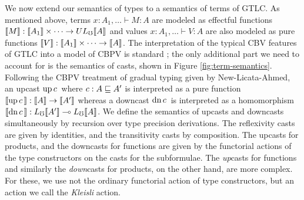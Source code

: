 We now extend our semantics of types to a semantics of terms of
GTLC. As mentioned above, terms $x:A_1,\ldots \vdash M : A$ are
modeled as effectful functions $\llbracket {M} \rrbracket: \llbracket {A_1} \rrbracket\times \cdots \to UL_\mho\llbracket {A} \rrbracket$
and values $x:A_1,\ldots \vdash V : A$ are also modeled as pure
functions $\llbracket {V} \rrbracket : \llbracket {A_1} \rrbracket\times\cdots \to \llbracket {A} \rrbracket$.
%
The interpretation of the typical CBV features of GTLC into a model of CBPV is
standard \cite{levy99}; the only additional part we need to account for
is the semantics of casts, shown in Figure \ref{fig:term-semantics}.
%
%
Following the CBPV treatment of gradual typing given by
New-Licata-Ahmed, an upcast $\text{up}\,{c}\,$ where $c : A \sqsubseteq A'$ is
interpreted as a pure function $\llbracket {\text{up}\,{c}\,} \rrbracket :\llbracket {A} \rrbracket \to \llbracket {A'} \rrbracket$ whereas a
downcast $\text{dn}\,{c}\,$ is interpreted as a homomorphism $\llbracket {\text{dn}\,{c}\,} \rrbracket :
L_\mho\llbracket {A'} \rrbracket \multimap L_\mho\llbracket {A} \rrbracket$.
We define the semantics of upcasts and downcasts simultaneously by
recursion over type precision derivations.
%
The reflexivity casts are given by identities, and the transitivity
casts by composition. The upcasts for products, and the downcasts for
functions are given by the functorial actions of the type constructors
on the casts for the subformulae.
%
The \emph{up}casts for functions and similarly the \emph{down}casts
for products, on the other hand, are more complex.
%
For these, we use not the ordinary functorial action of type
constructors, but an action we call the \emph{Kleisli} action.


